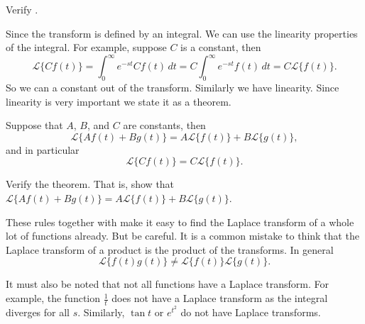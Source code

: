 \begin{exercise}
Verify .
\end{exercise}

Since the transform is defined by an integral.  We can use the linearity
properties of the integral.  For example, suppose $C$ is a constant, then
\begin{equation*}
\mathcal{L} \bigl\{ C f(t) \bigr\} =
\int_0^\infty e^{-st} C f(t) \,dt =
C \int_0^\infty e^{-st} f(t) \,dt =
C \mathcal{L} \bigl\{ f(t) \bigr\} .
\end{equation*}
So we can  a constant out of the transform.  Similarly  we have
linearity.
Since linearity is very important we state it as a theorem.

\begin{theorem}
Suppose that $A$, $B$, and $C$ are constants, then
\begin{equation*}
\boxed{~~
\mathcal{L} \bigl\{ A f(t) + B g(t) \bigr\} =
A \mathcal{L} \bigl\{ f(t) \bigr\} +
B \mathcal{L} \bigl\{ g(t) \bigr\} ,
~~}
\end{equation*}
and in particular
\begin{equation*}
\mathcal{L} \bigl\{ C f(t) \bigr\} =
C \mathcal{L} \bigl\{ f(t) \bigr\} .
\end{equation*}
\end{theorem}

\begin{exercise}
Verify the theorem.  That is, show that
$\mathcal{L} \bigl\{ A f(t) + B g(t) \bigr\} =
A \mathcal{L} \bigl\{ f(t) \bigr\} +
B \mathcal{L} \bigl\{ g(t) \bigr\}$.
\end{exercise}

These rules together with  make it easy to find
the Laplace transform of a whole lot of functions already.
But be careful.
It is a common mistake to think that the Laplace transform of a product
is the product of the transforms.  In general 
\begin{equation*}
\mathcal{L} \bigl\{ f(t) g(t) \bigr\} \not=
\mathcal{L} \bigl\{ f(t) \bigr\}
\mathcal{L} \bigl\{ g(t) \bigr\} .
\end{equation*}

It must also be noted that not all functions have a Laplace transform.  For
example, the function $\frac{1}{t}$ does not have a Laplace transform as the
integral diverges for all $s$.  Similarly,
$\tan t$ or $e^{t^2}$ do not have Laplace transforms.

